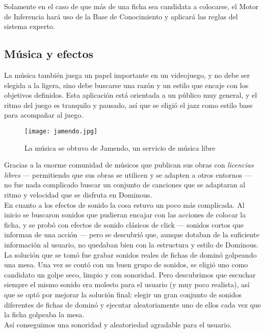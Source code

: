 Solamente en el caso de que más de una ficha sea candidata a colocarse, el Motor de Inferencia hará uso de la Base
de Conocimiento y aplicará las reglas del sistema experto.

\subsection{Música y efectos}

La música también juega un papel importante en un videojuego, y no debe ser elegida a la ligera, sino
        debe buscarse una razón y un estilo que encaje con los objetivos definidos. Esta aplicación está orientada a un
        público muy general, y el ritmo del juego es tranquilo y pausado, así que se eligió el jazz como estilo base
        para acompañar al juego.

\begin{figure}[h]
  \label{jamendo}
  \begin{center}
    \texttt{[image: jamendo.jpg]}
  \end{center}
  \caption{La música se obtuvo de Jamendo, un servicio de música libre}
\end{figure}

        Gracias a la enorme comunidad de músicos que publican sus obras con \emph{licencias libres}
        --- permitiendo que sus obras se utilicen y se adapten a otros entornos --- no fue nada complicado buscar
        un conjunto de canciones que se adaptaran al ritmo y velocidad que se disfruta en Dominous. \\

        En cuanto a los efectos de sonido la cosa estuvo un poco más complicada. Al inicio se buscaron sonidos que
        pudieran encajar con las acciones de colocar la ficha, y se probó con efectos de sonido clásicos de click --- sonidos
        cortos que informan de una acción --- pero se descubrió que, aunque dotaban de la suficiente información
        al usuario, no quedaban bien con la estructura y estilo de Dominous. \\

        La solución que se tomó fue grabar sonidos reales de fichas de dominó golpeando una mesa. Una vez se contó con
        un buen grupo de sonidos, se eligió uno como candidato un golpe seco, limpio y con sonoridad. Pero descubrimos
        que escuchar siempre el mismo sonido era molesto para el usuario (y muy poco realista), así que se optó por mejorar
        la solución final: elegir un gran conjunto de sonidos diferentes de fichas de dominó y ejecutar aleatoriamente
        uno de ellos cada vez que la ficha golpeaba la mesa. \\
        
        Así conseguimos una sonoridad y aleatoriedad agradable para el usuario.
